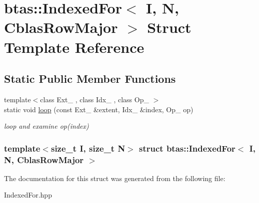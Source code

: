 \hypertarget{structbtas_1_1_indexed_for_3_01_i_00_01_n_00_01_cblas_row_major_01_4}{
\section{btas::IndexedFor$<$ I, N, CblasRowMajor $>$ Struct Template Reference}
\label{structbtas_1_1_indexed_for_3_01_i_00_01_n_00_01_cblas_row_major_01_4}
}
\subsection*{Static Public Member Functions}
\begin{DoxyCompactItemize}
\item 
\hypertarget{structbtas_1_1_indexed_for_3_01_i_00_01_n_00_01_cblas_row_major_01_4_a4e217800fff2b89e616155ebc720416d}{
{\footnotesize template$<$class Ext\_\- , class Idx\_\- , class Op\_\- $>$ }\\static void \hyperlink{structbtas_1_1_indexed_for_3_01_i_00_01_n_00_01_cblas_row_major_01_4_a4e217800fff2b89e616155ebc720416d}{loop} (const Ext\_\- \&extent, Idx\_\- \&index, Op\_\- op)}
\label{structbtas_1_1_indexed_for_3_01_i_00_01_n_00_01_cblas_row_major_01_4_a4e217800fff2b89e616155ebc720416d}

\begin{DoxyCompactList}\small\item\em loop and examine op(index) \item\end{DoxyCompactList}\end{DoxyCompactItemize}
\subsubsection*{template$<$size\_\-t I, size\_\-t N$>$ struct btas::IndexedFor$<$ I, N, CblasRowMajor $>$}



The documentation for this struct was generated from the following file:\begin{DoxyCompactItemize}
\item 
IndexedFor.hpp\end{DoxyCompactItemize}
